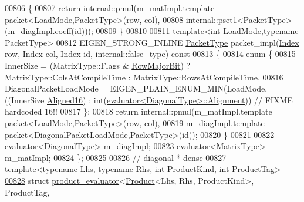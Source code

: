 \begin{DoxyCode}
00806 \textcolor{keyword}{  }\{
00807     \textcolor{keywordflow}{return} internal::pmul(m\_matImpl.template packet<LoadMode,PacketType>(row, col),
00808                           internal::pset1<PacketType>(m\_diagImpl.coeff(\textcolor{keywordtype}{id})));
00809   \}
00810   
00811   \textcolor{keyword}{template}<\textcolor{keywordtype}{int} LoadMode,\textcolor{keyword}{typename} PacketType>
00812   EIGEN\_STRONG\_INLINE \hyperlink{struct_eigen_1_1_packet_type}{PacketType} packet\_impl(\hyperlink{namespace_eigen_a62e77e0933482dafde8fe197d9a2cfde}{Index} row, \hyperlink{namespace_eigen_a62e77e0933482dafde8fe197d9a2cfde}{Index} col, 
      \hyperlink{namespace_eigen_a62e77e0933482dafde8fe197d9a2cfde}{Index} \textcolor{keywordtype}{id}, \hyperlink{struct_eigen_1_1internal_1_1false__type}{internal::false\_type})\textcolor{keyword}{ const}
00813 \textcolor{keyword}{  }\{
00814     \textcolor{keyword}{enum} \{
00815       InnerSize = (MatrixType::Flags & \hyperlink{group__flags_gae4f56c2a60bbe4bd2e44c5b19cbe8762}{RowMajorBit}) ? MatrixType::ColsAtCompileTime : 
      MatrixType::RowsAtCompileTime,
00816       DiagonalPacketLoadMode = EIGEN\_PLAIN\_ENUM\_MIN(LoadMode,((InnerSize%
      \hyperlink{group__enums_gga45fe06e29902b7a2773de05ba27b47a1af8e2bf74b04c02199f62c5e3c06dbfcc}{Aligned16}) : int(\hyperlink{struct_eigen_1_1internal_1_1evaluator}{evaluator<DiagonalType>::Alignment})) \textcolor{comment}{// FIXME
       hardcoded 16!!}
00817     \};
00818     \textcolor{keywordflow}{return} internal::pmul(m\_matImpl.template packet<LoadMode,PacketType>(row, col),
00819                           m\_diagImpl.template packet<DiagonalPacketLoadMode,PacketType>(\textcolor{keywordtype}{id}));
00820   \}
00821   
00822   \hyperlink{struct_eigen_1_1internal_1_1evaluator}{evaluator<DiagonalType>} m\_diagImpl;
00823   \hyperlink{struct_eigen_1_1internal_1_1evaluator}{evaluator<MatrixType>}   m\_matImpl;
00824 \};
00825 
00826 \textcolor{comment}{// diagonal * dense}
00827 \textcolor{keyword}{template}<\textcolor{keyword}{typename} Lhs, \textcolor{keyword}{typename} Rhs, \textcolor{keywordtype}{int} ProductKind, \textcolor{keywordtype}{int} ProductTag>
\hyperlink{struct_eigen_1_1internal_1_1product__evaluator_3_01_product_3_01_lhs_00_01_rhs_00_01_product_kinb2964e3ecd5359c634047e003305b765}{00828} \textcolor{keyword}{struct }\hyperlink{struct_eigen_1_1internal_1_1product__evaluator}{product\_evaluator}<\hyperlink{group___core___module_class_eigen_1_1_product}{Product}<Lhs, Rhs, ProductKind>, ProductTag, 

\end{DoxyCode}

